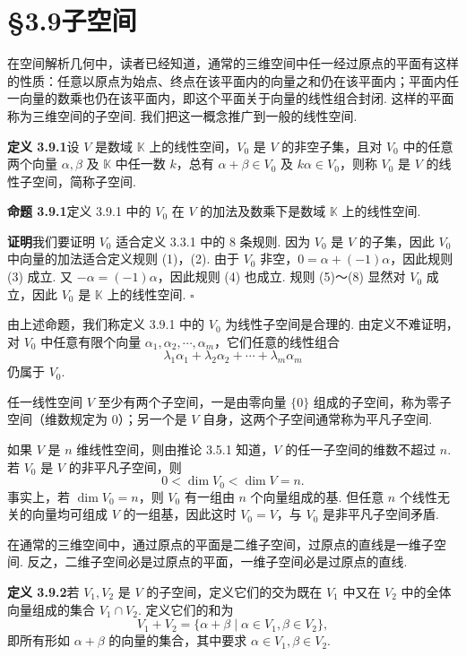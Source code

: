 \documentclass[UTF8, 12pt, fontset=fandol, oneside]{ctexart}
\begin{document}
\section*{§3.9\quad 子空间}

在空间解析几何中，读者已经知道，通常的三维空间中任一经过原点的平面有这样的性质：任意以原点为始点、终点在该平面内的向量之和仍在该平面内；平面内任一向量的数乘也仍在该平面内，即这个平面关于向量的线性组合封闭. 这样的平面称为三维空间的子空间. 我们把这一概念推广到一般的线性空间.

\noindent\textbf{定义 3.9.1}\quad 设 $V$ 是数域 $\mathbb{K}$ 上的线性空间，$V_0$ 是 $V$ 的非空子集，且对 $V_0$ 中的任意两个向量 $\alpha,\beta$ 及 $\mathbb{K}$ 中任一数 $k$，总有 $\alpha+\beta\in V_0$ 及 $k\alpha\in V_0$，则称 $V_0$ 是 $V$ 的线性子空间，简称子空间.

\noindent\textbf{命题 3.9.1}\quad 定义 3.9.1 中的 $V_0$ 在 $V$ 的加法及数乘下是数域 $\mathbb{K}$ 上的线性空间.

\noindent\textbf{证明}\quad 我们要证明 $V_0$ 适合定义 3.3.1 中的 8 条规则. 因为 $V_0$ 是 $V$ 的子集，因此 $V_0$ 中向量的加法适合定义规则 (1)，(2). 由于 $V_0$ 非空，$0=\alpha+(-1)\alpha$，因此规则 (3) 成立. 又 $-\alpha=(-1)\alpha$，因此规则 (4) 也成立. 规则 (5)～(8) 显然对 $V_0$ 成立，因此 $V_0$ 是 $\mathbb{K}$ 上的线性空间. $\square$

由上述命题，我们称定义 3.9.1 中的 $V_0$ 为线性子空间是合理的. 由定义不难证明，对 $V_0$ 中任意有限个向量 $\alpha_1,\alpha_2,\cdots,\alpha_m$，它们任意的线性组合
\[
\lambda_1\alpha_1+\lambda_2\alpha_2+\cdots+\lambda_m\alpha_m
\]
仍属于 $V_0$.

任一线性空间 $V$ 至少有两个子空间，一是由零向量 $\{0\}$ 组成的子空间，称为零子空间（维数规定为 0）；另一个是 $V$ 自身，这两个子空间通常称为平凡子空间.

如果 $V$ 是 $n$ 维线性空间，则由推论 3.5.1 知道，$V$ 的任一子空间的维数不超过 $n$. 若 $V_0$ 是 $V$ 的非平凡子空间，则
\[
0<\dim V_0<\dim V=n.
\]
事实上，若 $\dim V_0=n$，则 $V_0$ 有一组由 $n$ 个向量组成的基. 但任意 $n$ 个线性无关的向量均可组成 $V$ 的一组基，因此这时 $V_0=V$，与 $V_0$ 是非平凡子空间矛盾.

在通常的三维空间中，通过原点的平面是二维子空间，过原点的直线是一维子空间. 反之，二维子空间必是过原点的平面，一维子空间必是过原点的直线.

\noindent\textbf{定义 3.9.2}\quad 若 $V_1,V_2$ 是 $V$ 的子空间，定义它们的交为既在 $V_1$ 中又在 $V_2$ 中的全体向量组成的集合 $V_1\cap V_2$. 定义它们的和为
\[
V_1+V_2=\{\alpha+\beta\mid \alpha\in V_1,\beta\in V_2\},
\]
即所有形如 $\alpha+\beta$ 的向量的集合，其中要求 $\alpha\in V_1,\beta\in V_2$.
\end{document}
